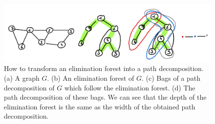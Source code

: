 \begin{figure}
    \includegraphics[width=\textwidth]{figures/treedepth-to-pathwidth.png}
    \caption{How to transform an elimination forest into a path decomposition. (a) A graph $G$. (b) An elimination forest of $G$. (c) Bags of a path decomposition of $G$ which follow the elimination forest. (d) The path decomposition of these bags. We can see that the depth of the elimination forest is the same as the width of the obtained path decomposition.}
    \label{fig:treedepth-to-pathwidth}
\end{figure}